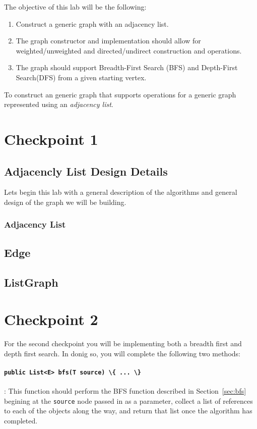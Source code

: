 \documentclass[a4paper]{article}
\begin{document}
The objective of this lab will be the following:
\begin{enumerate}
    \item Construct a generic graph with an adjacency list.
    \item The graph constructor and implementation should allow for weighted/unweighted and directed/undirect construction and operations.
    \item The graph should support Breadth-First Search (BFS) and Depth-First Search(DFS) from a given starting vertex.
\end{enumerate}
To construct an generic graph that supports operations for a generic graph represented using an \textit{adjacency list}. 

\section{Checkpoint 1}

\subsection{Adjacencly List  Design Details}

Lets begin this lab with a general description of the algorithms and general
design of the graph we will be building.

\subsubsection{Adjacency List}



\subsection{Edge}\label{sec:edge}


\subsection{ListGraph}



\section{Checkpoint 2}

For the second checkpoint you will be implementing both a breadth first and
depth first search. In donig so, you will complete the following two methods:

\paragraph{\lstinline|public List<E> bfs(T source) \{ ... \}|}: This function
should perform the BFS function described in Section~\ref{sec:bfs} begining at the
\lstinline|source| node passed in as a parameter, collect a list of references
to each of the objects along the way, and return that list once the algorithm
has completed.
\end{document}
